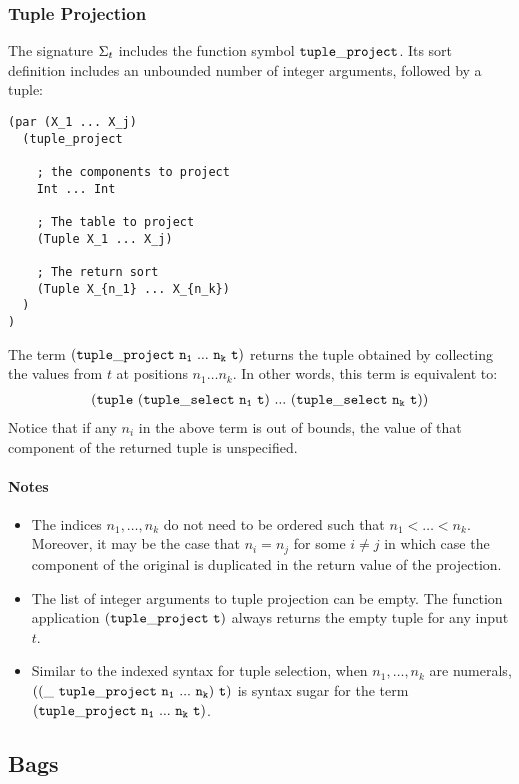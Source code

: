\documentclass[english,a4paper,10pt]{article}
\begin{document}
\subsubsection{Tuple Projection}
\label{sec:tup-project}
The signature $\Sigma_{t}$ includes 
the function symbol ${\tt tuple\_project}$.
Its sort definition includes an unbounded number of integer arguments, followed
by a tuple:
\begin{verbatim}
(par (X_1 ... X_j) 
  (tuple_project
    
    ; the components to project
    Int ... Int
  
    ; The table to project
    (Tuple X_1 ... X_j)
    
    ; The return sort
    (Tuple X_{n_1} ... X_{n_k})
  )
)
\end{verbatim}
The term
$\syntax{(tuple\_project\ n_1\ ...\ n_k\ t)}$
returns the tuple obtained by collecting the
values from $t$ at positions $n_1 \ldots n_k$.
In other words, this term is equivalent to:
\begin{align*}
{\tt (tuple\ (tuple\_select\ n_1\ t)\ ...\ (tuple\_select\ n_k\ t))}
\end{align*}
Notice that if any $n_i$ in the above term is out of bounds, the value of
that component of the returned tuple is unspecified.

\paragraph{Notes}
\begin{itemize}
\item
The indices $n_1, \ldots, n_k$ do not need to be ordered such that $n_1 < \ldots < n_k$.
Moreover, it may be the case that $n_i = n_j$ for some $i \neq j$ in which
case the component of the original is duplicated in the return value of the projection.
\item
The list of integer arguments to tuple projection can be empty.
The function application
${\tt (tuple\_project\ t)}$ always returns the empty tuple for any input $t$.
\item Similar to the indexed syntax for tuple selection,
when $n_1, \ldots, n_k$ are numerals,
$\syntax{((\_\ tuple\_project\ n_1\ ...\ n_k)\ t)}$ is syntax sugar for the term
$\syntax{(tuple\_project\ n_1\ ...\ n_k\ t)}$.
\end{itemize}

\subsection{Bags}
\end{document}
